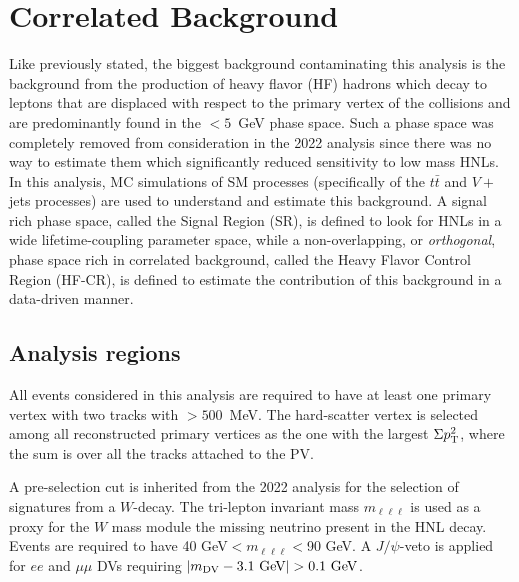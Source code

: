 \section{Correlated Background}\label{sec:corr_bkg}
Like previously stated, the biggest background contaminating this analysis is the background from the production of heavy flavor (HF) hadrons which decay to leptons that are displaced with respect to the primary vertex of the collisions and are predominantly found in the \mdv$<5$~GeV phase space. Such a phase space was completely removed from consideration in the 2022 analysis since there was no way to estimate them which significantly reduced sensitivity to low mass HNLs. In this analysis, MC simulations of SM processes (specifically of the $t\bar{t}$ and $V+$jets processes) are used to understand and estimate this background. A signal rich phase space, called the Signal Region (SR), is defined to look for HNLs in a wide lifetime-coupling parameter space, while a non-overlapping,  or \textit{orthogonal}, phase space rich in correlated background, called the Heavy Flavor Control Region (HF-CR), is defined to estimate the contribution of this background in a data-driven manner.

\subsection{Analysis regions}

All events considered in this analysis are required to have at least one primary vertex with two tracks with \pT$>500$~MeV. The hard-scatter vertex is selected among all reconstructed primary vertices as the one with the largest $\Sigma p_\mathrm{T}^2$, where the sum is over all the tracks attached to the PV.

A pre-selection cut is inherited from the 2022 analysis for the selection of signatures from a $W$-decay. The tri-lepton invariant mass $m_{\ell\ell\ell}$ is used as a proxy for the $W$ mass module the missing neutrino present in the HNL decay. Events are required to have 40 GeV$<m_{\ell\ell\ell}<$90 GeV. A $J/\psi$-veto is applied for $ee$ and $\mu\mu$ DVs requiring $|\mdv-3.1\text{ GeV}|>0.1\text{ GeV}$.

